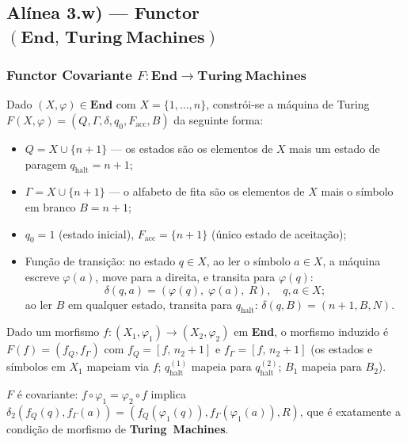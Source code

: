 \subsection{Alínea 3.w) --- Functor $(\mathbf{End},\, \mathbf{Turing\ Machines})$}
\label{subsec:functor-end-turing}
\subsubsection{Functor Covariante $F: \mathbf{End} \to \mathbf{Turing\ Machines}$}

\begin{definition}
Dado $(X,\varphi) \in \mathbf{End}$ com $X = \{1,\ldots,n\}$, constrói-se a máquina de Turing $F(X,\varphi) = (Q, \Gamma, \delta, q_0, F_{\mathrm{acc}}, B)$ da seguinte forma:
\begin{itemize}
    \item $Q = X \cup \{n{+}1\}$ --- os estados são os elementos de $X$ mais um estado de paragem $q_{\mathrm{halt}} = n{+}1$;
    \item $\Gamma = X \cup \{n{+}1\}$ --- o alfabeto de fita são os elementos de $X$ mais o símbolo em branco $B = n{+}1$;
    \item $q_0 = 1$ (estado inicial), $F_{\mathrm{acc}} = \{n{+}1\}$ (único estado de aceitação);
    \item Função de transição: no estado $q \in X$, ao ler o símbolo $a \in X$, a máquina escreve $\varphi(a)$, move para a direita, e transita para $\varphi(q)$:
    \[
        \delta(q, a) = (\varphi(q),\; \varphi(a),\; R), \quad q, a \in X;
    \]
    ao ler $B$ em qualquer estado, transita para $q_{\mathrm{halt}}$: $\delta(q, B) = (n{+}1, B, N)$.
\end{itemize}
Dado um morfismo $f: (X_1,\varphi_1) \to (X_2,\varphi_2)$ em \textbf{End}, o morfismo induzido é $F(f) = (f_Q, f_\Gamma)$ com $f_Q = [f,\, n_2{+}1]$ e $f_\Gamma = [f,\, n_2{+}1]$ (os estados e símbolos em $X_1$ mapeiam via $f$; $q_{\mathrm{halt}}^{(1)}$ mapeia para $q_{\mathrm{halt}}^{(2)}$; $B_1$ mapeia para $B_2$).
\end{definition}

\begin{proposition}
$F$ é covariante: $f \circ \varphi_1 = \varphi_2 \circ f$ implica $\delta_2(f_Q(q),f_\Gamma(a))=(f_Q(\varphi_1(q)),f_\Gamma(\varphi_1(a)),R)$, que é exatamente a condição de morfismo de \textbf{Turing\ Machines}.
\end{proposition}

